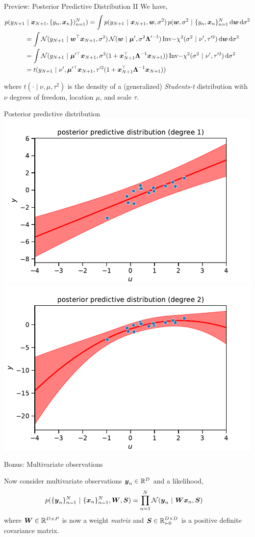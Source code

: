 \documentclass[aspectratio=169]{beamer}
\begin{document}
\begin{frame}{Preview: Posterior Predictive Distribution II}
We have,
\begin{align}
    p(y_{N+1} &~\vert~ \boldsymbol{x}_{N+1}, \{y_n, \boldsymbol{x}_n\})_{n=1}^N)
    = \int p(y_{N+1} ~\vert~ \boldsymbol{x}_{N+1}, \boldsymbol{w}, \sigma^2) \, p(\boldsymbol{w}, \sigma^2 ~\vert~ \{y_{n}, \boldsymbol{x}_n\}_{n=1}^N \mathop{}\!\mathrm{d} \boldsymbol{w} \mathop{}\!\mathrm{d} \sigma^2 \\
    &= 
    \int \mathcal{N}(y_{N+1} ~\vert~ \boldsymbol{w}^\top \boldsymbol{x}_{N+1}, \sigma^2) \, \mathcal{N}(\boldsymbol{w} ~\vert~ \boldsymbol{\mu}', \sigma^2 \boldsymbol{\Lambda}'^{-1}) \, \mathrm{Inv-}\chi^2(\sigma^2 ~\vert~ \nu', \tau'^2) \mathop{}\!\mathrm{d} \boldsymbol{w} \mathop{}\!\mathrm{d} \sigma^2 \\
    &= 
    \int \mathcal{N}(y_{N+1} ~\vert~ \boldsymbol{\mu}'^\top \boldsymbol{x}_{N+1}, \sigma^2 ( 1 + \boldsymbol{x}_{N+1}^\top \boldsymbol{\Lambda}^{-1} \boldsymbol{x}_{N+1})) \,  \mathrm{Inv-}\chi^2(\sigma^2 ~\vert~ \nu', \tau'^2) \mathop{}\!\mathrm{d} \sigma^2 \\
    &= t(y_{N+1} ~\vert~ \nu', \boldsymbol{\mu}'^\top \boldsymbol{x}_{N+1}, \tau'^2 ( 1 + \boldsymbol{x}_{N+1}^\top \boldsymbol{\Lambda}^{-1} \boldsymbol{x}_{N+1})) 
\end{align}

where $t(\cdot \mid \nu, \mu, \tau^2)$ is the density of a (generalized) \emph{Students-t} distribution with $\nu$ degrees of freedom, location $\mu$, and scale $\tau$.
\end{frame}

\begin{frame}{Posterior predictive distribution}
\centering
\includegraphics[width=.49\linewidth]{figures/lap1/post_pred_1.pdf}
\includegraphics[width=.49\linewidth]{figures/lap1/post_pred_2.pdf}
\end{frame}

\begin{frame}{Bonus: Multivariate observations}

Now consider multivariate observations $\boldsymbol{y}_n \in \mathbb{R}^D$ and a likelihood,
\begin{align}
    p(\{\boldsymbol{y}_n\}_{n=1}^N ~\vert~ \{\boldsymbol{x}_n\}_{n=1}^N, \boldsymbol{W}, \boldsymbol{S}) 
    &= \prod_{n=1}^N \mathcal{N}(\boldsymbol{y}_n ~\vert~ \boldsymbol{W} \boldsymbol{x}_n, \boldsymbol{S}) 
\end{align}
where $\boldsymbol{W} \in \mathbb{R}^{D \times P}$ is now a weight \textit{matrix} and $\boldsymbol{S} \in \mathbb{R}_{\succ 0}^{D \times D}$ is a positive definite covariance matrix. 
\end{frame}
\end{document}
